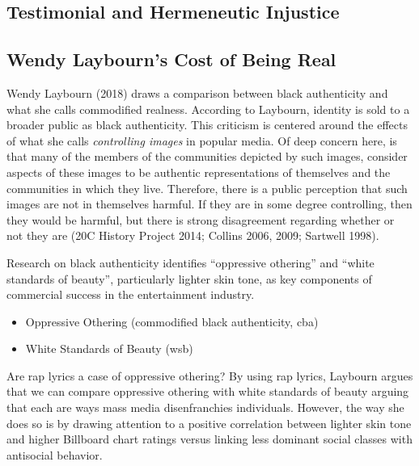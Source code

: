 \documentclass[
  letterpaper,
  DIV=11,
  numbers=noendperiod]{scrreprt}
\providecommand{\tightlist}{%
  \setlength{\itemsep}{0pt}\setlength{\parskip}{0pt}}\usepackage{longtable,booktabs,array}
\begin{document}
\begin{tcolorbox}[enhanced jigsaw, arc=.35mm, breakable, rightrule=.15mm, colback=white, colframe=quarto-callout-important-color-frame, bottomrule=.15mm, leftrule=.75mm, opacityback=0, toprule=.15mm, left=2mm]
\begin{tcolorbox}[enhanced jigsaw, arc=.35mm, breakable, rightrule=.15mm, colback=white, colframe=quarto-callout-tip-color-frame, bottomrule=.15mm, leftrule=.75mm, opacityback=0, toprule=.15mm, left=2mm]
\hfill\break

\section{Testimonial and Hermeneutic
Injustice}\label{testimonial-and-hermeneutic-injustice}

\subsection{Wendy Laybourn's Cost of Being
Real}\label{wendy-laybourns-cost-of-being-real-1}

Wendy Laybourn (2018) draws a comparison between black authenticity and
what she calls commodified realness. According to Laybourn, identity is
sold to a broader public as black authenticity. This criticism is
centered around the effects of what she calls \emph{controlling images}
in popular media. Of deep concern here, is that many of the members of
the communities depicted by such images, consider aspects of these
images to be authentic representations of themselves and the communities
in which they live. Therefore, there is a public perception that such
images are not in themselves harmful. If they are in some degree
controlling, then they would be harmful, but there is strong
disagreement regarding whether or not they are (20C History Project
2014; Collins 2006, 2009; Sartwell 1998).

Research on black authenticity identifies ``oppressive othering'' and
``white standards of beauty'', particularly lighter skin tone, as key
components of commercial success in the entertainment industry.

\begin{itemize}
\tightlist
\item
  Oppressive Othering (commodified black authenticity, cba)
\item
  White Standards of Beauty (wsb)
\end{itemize}

Are rap lyrics a case of oppressive othering? By using rap lyrics,
Laybourn argues that we can compare oppressive othering with white
standards of beauty arguing that each are ways mass media disenfranchies
individuals. However, the way she does so is by drawing attention to a
positive correlation between lighter skin tone and higher Billboard
chart ratings versus linking less dominant social classes with
antisocial behavior.


\end{tcolorbox}
\end{tcolorbox}
\end{document}
